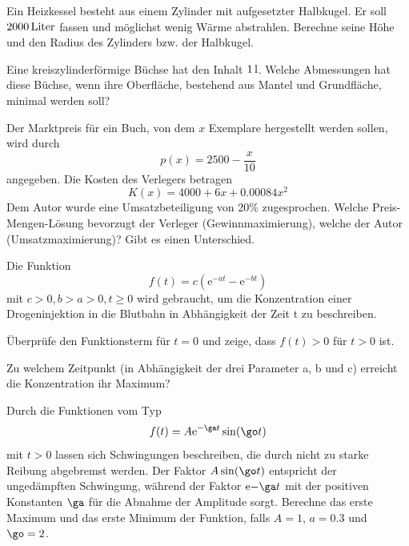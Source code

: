 \documentclass[%
11pt,%
twoside,%
titlepage,%
german,%
headsepline%
]{scrartcl}
\begin{document}
\begin{ueb}[Heizkessel]
 Ein Heizkessel besteht aus einem Zylinder mit aufgesetzter Halbkugel. Er soll $\unit[2000]{Liter}$ fassen und m\"oglichst wenig W\"arme abstrahlen. Berechne seine Höhe und den Radius des Zylinders bzw. der Halbkugel.
 \end{ueb}

\begin{ueb}[Büchse]
Eine
kreiszylinderf\"ormige B\"uchse hat den Inhalt $\unit[1]{l}$. Welche Abmessungen hat diese B\"uchse, wenn ihre Oberfl\"ache, bestehend aus Mantel und Grundfl\"ache, minimal werden soll?
\end{ueb}

\begin{ueb}[Marktpreis]
Der Marktpreis f\"ur ein Buch, von dem $x$ Exemplare hergestellt werden sollen, wird durch
$$p(x)=2500-\frac{x}{10}$$
angegeben. Die Kosten des Verlegers betragen
$$K(x)=4000+6x+0.00084x^2$$
Dem Autor wurde eine Umsatzbeteiligung von 20\% zugesprochen. Welche Preis-Mengen-L\"osung bevorzugt der Verleger (Gewinnmaximierung), welche der Autor (Umsatzmaximierung)? Gibt es einen Unterschied.
\end{ueb}

\begin{ueb}[Drogen]
Die
Funktion
$$f(t)=c\left(\mathrm{e}^{-at}-\mathrm{e}^{-bt}\right)$$
mit $c>0, b>a>0, t\geq0$ wird gebraucht, um die Konzentration einer Drogeninjektion in die Blutbahn in Abh\"angigkeit der Zeit t zu beschreiben.
\begin{enumeratea}
\item \"Uberpr\"ufe den Funktionsterm f\"ur $t = 0$ und zeige,
dass $f(t) >0$ f\"ur $t >0$ ist.
\item Zu welchem Zeitpunkt (in Abh\"angigkeit der drei Parameter a, b und c) erreicht die Konzentration ihr Maximum?
\end{enumeratea}
\end{ueb}

\begin{ueb}
Durch
die Funktionen vom Typ
$$f(t)=A\mathrm{e}^{-\ga t}\sin(\go t)$$
mit $t>0$ lassen sich Schwingungen beschreiben, die durch nicht zu starke Reibung abgebremst werden. Der Faktor $A\sin(\go t)$ entspricht der unged\"ampften Schwingung, w\"ahrend der Faktor $\mathrm{e}{-\ga t}$ mit der positiven Konstanten $\ga$ f\"ur die Abnahme der Amplitude sorgt. Berechne das erste Maximum und das erste Minimum der Funktion, falls $A = 1$, $a = 0.3$ und $\go=2$.
\end{ueb}
\end{document}
